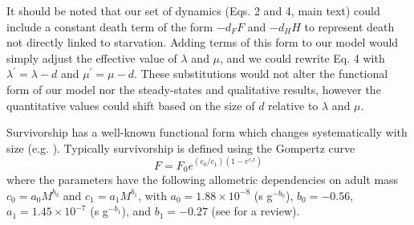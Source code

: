 \documentclass[onecolumn,preprintnumbers,amsmath,amssymb,superscriptaddress]{revtex4}
\begin{document}
% 
% 
% 
% 
% 
% 
% 
% 






It should be noted that our set of dynamics (Eqs. 2 and 4, main text) could include a constant death term of the form $-d_{F}F$ and $-d_{H}H$ to represent death not directly linked to starvation. Adding terms of this form to our model would simply adjust the effective value of $\lambda$ and $\mu$, and we could rewrite Eq. 4 with $\lambda^{\prime}=\lambda-d$ and $\mu^{\prime}=\mu-d$. These substitutions would not alter the functional form of our model nor the steady-states and qualitative results, however the quantitative values could shift based on the size of $d$ relative to $\lambda$ and $\mu$. 

Survivorship has a well-known functional form which changes systematically with size (e.g. \citep{calder1984}). Typically survivorship is defined using the Gompertz curve 
\begin{equation}
F=F_{0}e^{\left(c_{0}/c_{1}\right)\left(1-e^{c_{1}t}\right)}
\label{gompertz}
\end{equation}
where the parameters have the following allometric dependencies on adult mass $c_{0}=a_{0}M^{b_{0}}$ and $c_{1}=a_{1}M^{b_{1}}$, with $a_{0}=1.88\times10^{-8}$ (s g$^{-b_{0}}$), $b_{0}=-0.56$, $a_{1}=1.45\times10^{-7}$ (s g$^{-b_{1}}$), and $b_{1}=-0.27$ (see \citep{calder1984} for a review).
\end{document}
